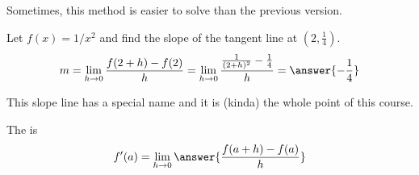 \documentclass{ximera}
\begin{document}
Sometimes, this method is easier to solve than the previous version.

\begin{example}\label{example:4-10}
Let $f(x)=1 / x^{2}$ and find the slope of the tangent line at $\left(2, \frac{1}{4}\right)$.
\[
m=\lim_{h\rightarrow 0}\frac{f(2+h)-f(2)}{h}=\lim_{h\rightarrow 0}\frac{\frac{1}{(2+h)^{2}}-\frac{1}{4}}{h}=\answer{-\frac{1}{4}}
\]
\end{example}

This slope line has a special name and it is (kinda) the whole point of this course.

\begin{definition}\label{definition:4-11}
The  is
\[
f^{\prime}(a)=\lim_{h\rightarrow 0}\answer{\frac{f(a+h)-f(a)}{h}}
\]
\end{definition}
\end{document}
